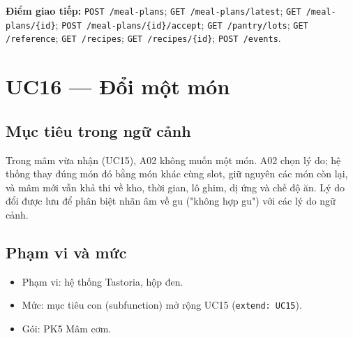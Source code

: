 \textbf{Điểm giao tiếp:} {\small\texttt{POST /\allowbreak{}\allowbreak{}meal-\allowbreak{}plans}}; {\small\texttt{GET /\allowbreak{}\allowbreak{}meal-\allowbreak{}plans/\allowbreak{}\allowbreak{}latest}}; {\small\texttt{GET /\allowbreak{}\allowbreak{}meal-\allowbreak{}plans/\allowbreak{}\allowbreak{}\{id\}}}; {\small\texttt{POST /\allowbreak{}\allowbreak{}meal-\allowbreak{}plans/\allowbreak{}\allowbreak{}\{id\}/\allowbreak{}\allowbreak{}accept}}; {\small\texttt{GET /\allowbreak{}\allowbreak{}pantry/\allowbreak{}\allowbreak{}lots}}; {\small\texttt{GET /\allowbreak{}\allowbreak{}reference}}; {\small\texttt{GET /\allowbreak{}\allowbreak{}recipes}}; {\small\texttt{GET /\allowbreak{}\allowbreak{}recipes/\allowbreak{}\allowbreak{}\{id\}}}; {\small\texttt{POST /\allowbreak{}\allowbreak{}events}}.

\section{UC16 --- Đổi một món}
\subsection{Mục tiêu trong ngữ cảnh}
Trong mâm vừa nhận (UC15), A02 không muốn một món. A02 chọn lý do; hệ thống thay đúng món đó bằng món khác cùng slot, giữ nguyên các món còn lại, và mâm mới vẫn khả thi về kho, thời gian, lô ghim, dị ứng và chế độ ăn. Lý do đổi được lưu để phân biệt nhãn âm về gu ("không hợp gu") với các lý do ngữ cảnh.

\subsection{Phạm vi và mức}
\begin{itemize}
\item Phạm vi: hệ thống Tastoria, hộp đen.
\item Mức: mục tiêu con (subfunction) mở rộng UC15 ({\small\texttt{extend: UC15}}).
\item Gói: PK5 Mâm cơm.
\end{itemize}
